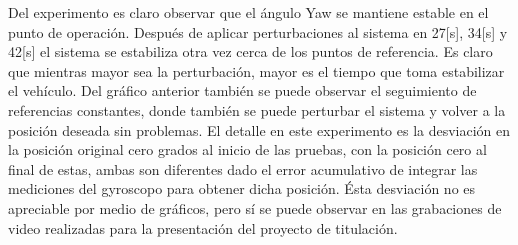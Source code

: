 \documentclass[\main/main.tex]{subfiles}
\begin{document}
\begin{enumerate}
	Del experimento es claro observar que el ángulo Yaw se mantiene estable
	en el punto de operación. Después de aplicar perturbaciones al sistema
	en 27{[}s{]}, 34{[}s{]} y 42{[}s{]} el sistema se estabiliza otra
	vez cerca de los puntos de referencia. Es claro que mientras mayor
	sea la perturbación, mayor es el tiempo que toma estabilizar el vehículo.
	Del gráfico anterior también se puede observar el seguimiento de referencias
	constantes, donde también se puede perturbar el sistema y volver a
	la posición deseada sin problemas. El detalle en este experimento
	es la desviación en la posición original cero grados al inicio de
	las pruebas, con la posición cero al final de estas, ambas son diferentes
	dado el error acumulativo de integrar las mediciones del gyroscopo
	para obtener dicha posición. Ésta desviación no es apreciable por medio de gráficos, pero sí se puede 		observar en las grabaciones de video realizadas para la presentación del proyecto de titulación.
\end{enumerate}
\end{document}
